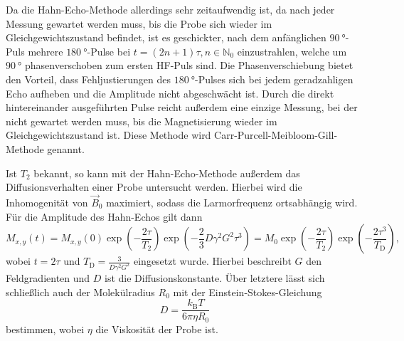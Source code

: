 Da die Hahn-Echo-Methode allerdings sehr zeitaufwendig ist, da nach jeder Messung gewartet werden muss, bis die Probe sich wieder im Gleichgewichtszustand befindet, ist es geschickter, nach dem anfänglichen $\SI{90}{\degree}$-Puls mehrere $\SI{180}{\degree}$-Pulse bei $t = (2n+1)\tau, n \in \mathbb{N}_0$ einzustrahlen, welche um $\SI{90}{\degree}$ phasenverschoben zum ersten HF-Puls sind. Die Phasenverschiebung bietet den Vorteil, dass Fehljustierungen des $\SI{180}{\degree}$-Pulses sich bei jedem geradzahligen Echo aufheben und die Amplitude nicht abgeschwächt ist. Durch die direkt hintereinander ausgeführten Pulse reicht außerdem eine einzige Messung, bei der nicht gewartet werden muss, bis die Magnetisierung wieder im Gleichgewichtszustand ist. Diese Methode wird Carr-Purcell-Meibloom-Gill-Methode genannt.

Ist $T_2$ bekannt, so kann mit der Hahn-Echo-Methode außerdem das Diffusionsverhalten einer Probe untersucht werden. Hierbei wird die Inhomogenität von $\vec{B}_0$ maximiert, sodass die Larmorfrequenz ortsabhängig wird. Für die Amplitude des Hahn-Echos gilt dann
\begin{equation}
  M_{x,y} \left(t\right) = M_{x,y}\left(0\right) \exp \left(-\frac{2\tau}{T_2}\right) \exp \left(-\frac{2}{3} D \gamma^2 G^2 \tau^3\right) = M_0 \exp \left(-\frac{2\tau}{T_2}\right) \exp \left(-\frac{2\tau^3}{T_\mathrm{D}}\right),
  \label{eq:D}
\end{equation}
wobei $t = 2\tau$ und $T_\mathrm{D} = \frac{3}{D \gamma^2 G^2}$ eingesetzt wurde. Hierbei beschreibt $G$ den Feldgradienten und $D$ ist die Diffusionskonstante. Über letztere lässt sich schließlich auch der Molekülradius $R_0$ mit der Einstein-Stokes-Gleichung
\begin{equation}
  D = \frac{k_\mathrm{B} T}{6\pi\eta R_0}
  \label{eq:R0}
\end{equation}
bestimmen, wobei $\eta$ die Viskosität der Probe ist.
